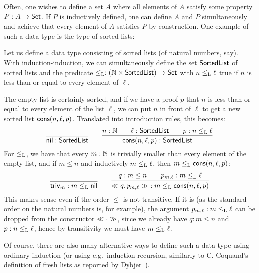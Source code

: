 \documentclass{article}
\begin{document}
Often, one wishes to define a set $A$ where all elements of $A$
satisfy some property $P : A \to \mathsf{Set}$. If $P$ is inductively defined,
one can define $A$ and $P$ simultaneously and achieve that every
element of $A$ satisfies $P$ by construction. One example of such a
data type is the type of sorted lists:

\begin{example}
\label{ex:sorted-list}

Let us define a data type consisting of sorted lists (of natural
numbers, say). With induction-induction, we can simultaneously define
the set $\mathsf{SortedList}$ of sorted lists and the predicate $\leq_{\text{L}} :
(\mathbb{N} \times \mathsf{SortedList}) \to \mathsf{Set}$ with $n \leq_{\text{L}} \ell$ true if
$n$ is less than or equal to every element of $\ell$.

The empty list is certainly sorted, and if we have a proof $p$ that
$n$ is less than or equal to every element of the list $\ell$, we can
put $n$ in front of $\ell$ to get a new sorted list
$\mathsf{cons}(n, \ell, p)$. Translated into introduction rules, this becomes:
\[
\infer{\nilList : \SortedList}{} \qquad
\infer{\consList{n}{\ell}{p} : \SortedList}{n : \Nat \quad & \ell : \SortedList \quad & p : n \lessList \ell}
\]
For $\leq_{\text{L}}$, we have that every $m : \mathbb{N}$ is trivially smaller
than every element of the empty list, and if $m \leq n$ and
inductively $m \leq_{\text{L}} \ell$, then $m \leq_{\text{L}} \mathsf{cons}(n, \ell, p)$:
\[
\infer{\nilLess{m} : m \lessList \nilList}
{} \qquad
\infer{\consLess{n}{\ell}{p}{m}{q}{p_{m, \ell}}\ : m \lessList \consList{n}{\ell}{p}}
       {q : m \leq n \quad & p_{m, \ell} : m \lessList \ell}
\]
This makes sense even if the order $\leq$ is not transitive. If it is
(as the standard order on the natural numbers is, for example), the
argument $p_{m, \ell} : m \leq_{\text{L}} \ell$ can be dropped from the
constructor $\ll \cdot \gg$, since we already have $q : m \leq n$ and
$p : n \leq_{\text{L}} \ell$, hence by transitivity we must have $m
\leq_{\text{L}} \ell$.

Of course, there are also many alternative ways to define such a data
type using ordinary induction (or using e.g.\ induction-recursion,
similarly to C. Coquand's definition of fresh lists as reported by
Dybjer~\cite{dybjer2000IR}).
\blackqed
\end{example}
\end{document}
